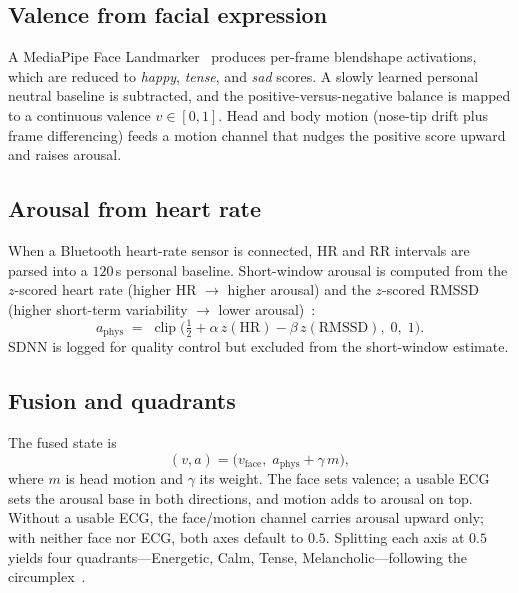 \documentclass[11pt]{article}
\newcommand{\valence}{\ensuremath{v}}
\newcommand{\arousal}{\ensuremath{a}}
\begin{document}
\subsection{Valence from facial expression}
A MediaPipe Face Landmarker~\cite{mediapipe2019} produces per-frame blendshape
activations, which are reduced to \emph{happy}, \emph{tense}, and \emph{sad}
scores. A slowly learned personal neutral baseline is subtracted, and the
positive-versus-negative balance is mapped to a continuous valence
$\valence \in [0,1]$. Head and body motion (nose-tip drift plus frame
differencing) feeds a motion channel that nudges the positive score upward and
raises arousal.

\subsection{Arousal from heart rate}
When a Bluetooth heart-rate sensor is connected, HR and RR intervals are parsed
into a $120\,$s personal baseline. Short-window arousal is computed from the
$z$-scored heart rate (higher HR $\rightarrow$ higher arousal) and the
$z$-scored RMSSD (higher short-term variability $\rightarrow$ lower
arousal)~\cite{shaffer2017}:
\begin{equation}
\arousal_{\text{phys}} \;=\; \operatorname{clip}\!\Big(\tfrac{1}{2}
+ \alpha\, z(\mathrm{HR}) - \beta\, z(\mathrm{RMSSD}),\; 0,\; 1\Big).
\end{equation}
SDNN is logged for quality control but excluded from the short-window estimate.

\subsection{Fusion and quadrants}
The fused state is
\begin{equation}
(\valence, \arousal) =
\big(\valence_{\text{face}},\; \arousal_{\text{phys}} + \gamma\, m\big),
\end{equation}
where $m$ is head motion and $\gamma$ its weight. The face sets valence; a usable
ECG sets the arousal base in both directions, and motion adds to arousal on top.
Without a usable ECG, the face/motion channel carries arousal upward only; with
neither face nor ECG, both axes default to $0.5$. Splitting each axis at $0.5$
yields four quadrants---Energetic, Calm, Tense, Melancholic---following the
circumplex~\cite{russell1980,posner2005}.
\end{document}
